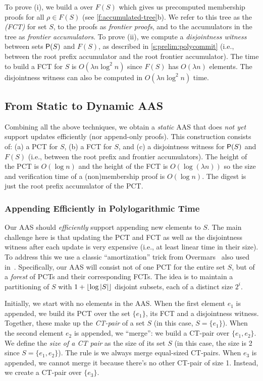 To prove (i), we build a \communionTree over $F(S)$ which gives us precomputed membership proofs for all $\rho \in F(S)$ (see \cref{f:accumulated-tree}b).
We refer to this tree as the \emph{\frontierCommunionTree (FCT)} for set $S$, to the proofs as \textit{frontier proofs}, and to the accumulators in the tree as \textit{frontier accumulators}.
To prove (ii), we compute a \emph{disjointness witness} between sets $\mathsf{P}(S)$ and $F(S)$, as described in \cref{s:prelim:polycommit} (i.e., between the root prefix accumulator and the root frontier accumulator).
The time to build a FCT for $S$ is $O(\lambda n\log^2{n})$ since $F(S)$ has $O(\lambda n)$ elements.
The disjointness witness can also be computed in $O(\lambda n\log^2{n})$ time.

\subsection{From Static to Dynamic AAS}

Combining all the above techniques, we obtain a \textit{static} AAS that does \textit{not yet} support updates efficiently (nor append-only proofs).
This construction consists of: (a) a PCT for $S$, (b) a FCT for $S$, and (c) a disjointness witness for $\mathsf{P}(S)$ and $F(S)$ (i.e., between the root prefix and frontier accumulators).
The height of the PCT is $O(\log n)$ and the height of the FCT is $O(\log{(\lambda n)})$ so the size and verification time of a (non)membership proof is $O(\log{n})$.
The digest is just the root prefix accumulator of the PCT. 

\subsubsection{Appending Efficiently in Polylogarithmic Time}
Our AAS should \textit{efficiently} support appending new elements to $S$. 
The main challenge here is that updating the PCT and FCT as well as the disjointness witness after each update is very expensive (i.e., at least linear time in their size).
To address this we use a classic ``amortization'' trick from Overmars~\cite{overmars} also used in~\cite{distributed-acc}. 
Specifically, our AAS will consist not of one PCT for the entire set $S$, but of a \textit{forest} of PCTs and their corresponding FCTs.
The idea is to maintain a partitioning of $S$ with $1 + \lfloor\log{|S|}\rfloor$ disjoint subsets, each of a distinct size $2^i$.

\forestFig

Initially, we start with no elements in the AAS.
When the first element $e_1$ is appended, we build its PCT over the set $\{e_1\}$, its FCT and a disjointness witness.
Together, these make up the \textit{CT-pair} of a set $S$ (in this case, $S=\{e_1\}$).
When the second element $e_2$ is appended, we ``merge'': we build a CT-pair over $\{e_1, e_2\}$.
We define the \textit{size of a CT pair} as the size of its set $S$ (in this case, the size is 2 since $S=\{e_1,e_2\}$).
The rule is we always merge equal-sized CT-pairs.
When $e_3$ is appended, we cannot merge it because there's no other CT-pair of size 1.
Instead, we create a CT-pair over $\{e_3\}$.


